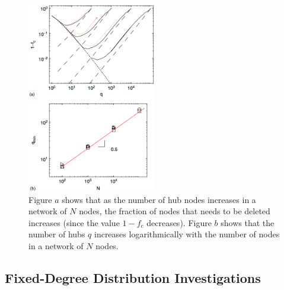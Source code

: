 \documentclass[doc]{apa}%
\begin{document}
\begin{figure}[h!]
	\label{fractionalResults}
	\centering
		\includegraphics[width=0.5\textwidth]{fractional_results.png}
	\caption{Figure $a$ shows that as the number of hub nodes increases in a network of $N$ nodes, the fraction of nodes that needs to be deleted increases (since the value $1 - f_c$ decreases). Figure $b$ shows that the number of hubs $q$ increases logarithmically with the number of nodes in a network of $N$ nodes.}
\end{figure}


\subsection{Fixed-Degree Distribution Investigations}
\end{document}
